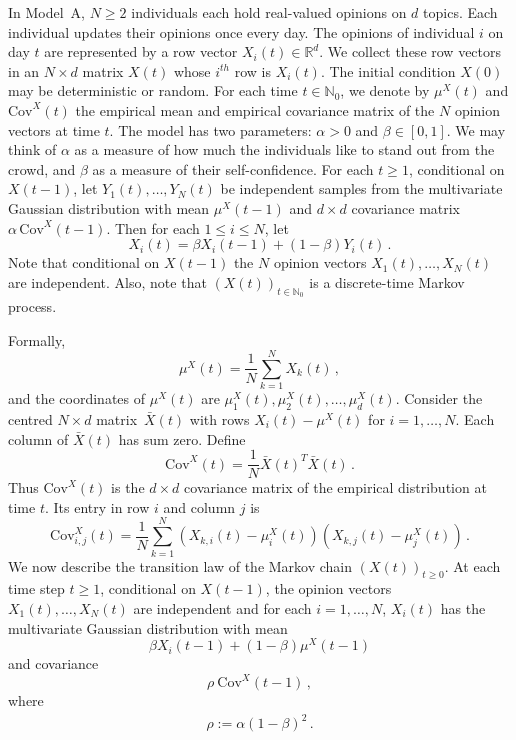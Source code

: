 \documentclass[12pt]{article}
\newcommand{\Cov}{\mathrm{Cov}}
\newcommand{\1}{\mathbf{1}}
\begin{document}
In Model~A, $N \ge 2$ individuals each hold real-valued opinions on $d$ topics. Each individual updates their opinions once every day. The opinions of individual $i$ on day $t$ are represented by a row vector $X_i(t) \in \mathbb{R}^d$. We collect these row vectors in an $N\times d$ matrix $X(t)$ whose $i^{th}$ row is $X_i(t)$. The initial condition $X(0)$ may be deterministic or random. For each time $t \in \mathbb{N}_0$, we denote by $\mu^X(t)$ and $\Cov^X(t)$ the empirical mean and empirical covariance matrix of the $N$ opinion vectors at time $t$. The model has two parameters: $\alpha > 0$ and $\beta \in [0,1]$. We may think of $\alpha$ as a measure of how much the individuals like to stand out from the crowd, and $\beta$ as a measure of their self-confidence.   For each $t \ge 1$, conditional on $X(t-1)$, let $Y_1(t), \dots, Y_N(t)$ be independent samples from the multivariate Gaussian distribution with mean $\mu^X(t-1)$ and $d\times d$ covariance matrix $\alpha\, \Cov^X(t-1)$. Then for each $1 \le i \le N$, let 
\begin{equation}\label{E: first definition of model A} 
X_i(t) = \beta X_{i}(t-1) + (1-\beta) Y_i(t)\,.
\end{equation}
Note that conditional on $X(t-1)$ the  $N$ opinion vectors $X_1(t), \dots, X_N(t)$ are independent. Also, note that  $\left(X(t)\right)_{t \in \mathbb{N}_0}$ is a discrete-time Markov process.








Formally, 
$$ 
\mu^X(t) = \frac{1}{N}\sum_{k=1}^N X_k(t)\,,
$$
and the coordinates of $\mu^X(t)$ are $\mu_1^X(t),\mu_2^X(t),\dots,\mu_d^X(t)$. Consider the centred $N \times d$ matrix~$\bar X(t)$ with rows $X_i(t) - \mu^X(t)$ for $i = 1, \dots, N$. Each column of $\bar X(t)$ has sum zero. Define $$\Cov^X(t) = \frac{1}{N} \bar X(t)^T \bar X(t)\,.$$ Thus $\Cov^X(t)$ is the $d\times d$ covariance matrix of the empirical distribution at time $t$. Its entry in row $i$ and column $j$ is
$$ 
\Cov_{i,j}^X(t) =  \frac{1}{N}\sum_{k=1}^N \left(X_{k,i}(t) - \mu_i^X(t) \right)\left(X_{k,j}(t) - \mu_j^X(t)\right)\,.
$$
We now describe the transition law of the Markov chain $\left(X(t)\right)_{t \ge 0}$. At each time step $t \ge 1$, conditional on $X(t-1)$, the opinion vectors $X_1(t), \dots, X_N(t)$ are independent and for each $i = 1, \dots, N$, $X_i(t)$ has the multivariate Gaussian distribution with mean
$$ 
\beta X_i(t-1) + (1-\beta)\mu^X(t-1)$$ and covariance 
$$
\rho\ \Cov^X(t-1)\,,$$
 where 
\begin{align}\label{defrho}
\rho :=\alpha (1-\beta)^2\,.    
\end{align}
\end{document}
